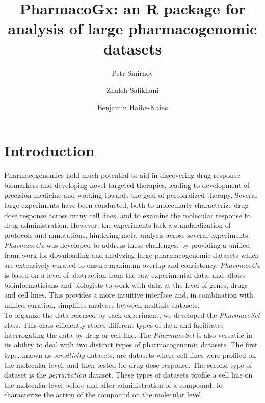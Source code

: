 \documentclass[11pt]{article}
\title{PharmacoGx: an R package for analysis of large pharmacogenomic datasets}
\author[1]{Petr Smirnov}
\author[1,2]{Zhaleh Safikhani}
\author[1,2]{Benjamin Haibe-Kains}
\affil[1]{Princess Margaret Cancer Centre, University Health Network, Toronto Canada}
\affil[2]{Department of Medical Biophysics, University of Toronto, Toronto Canada}
\begin{document}


\maketitle
\tableofcontents

\section{Introduction}

Pharmacogenomics hold much potential to aid in discovering drug response
biomarkers and developing novel targeted therapies, leading to development of
precision medicine and working towards the goal of personalized therapy.
Several large experiments have been conducted, both to molecularly
characterize drug dose response across many cell lines, and to examine the
molecular response to drug administration. However, the experiments lack a
standardization of protocols and annotations, hindering meta-analysis across
several experiments.\\

\textit{PharmacoGx} was developed to address these challenges, by providing a
unified framework for downloading and analyzing large pharmacogenomic datasets
which are extensively curated to ensure maximum overlap and consistency.
\textit{PharmacoGx} is based on a level of abstraction from the raw
experimental data, and allows bioinformaticians and biologists to work with
data at the level of genes, drugs and cell lines. This provides a more
intuitive interface and, in combination with unified curation, simplifies
analyses between multiple datasets.\\

To organize the data released by each experiment, we developed the
\textit{PharmacoSet} class. This class efficiently stores different types of
data and facilitates interrogating the data by drug or cell line. The
\textit{PharmacoSet} is also versatile in its ability to deal with two
distinct types of pharmacogenomic datasets. The first type, known as
\textit{sensitivity} datasets, are datasets where cell lines were profiled
on the molecular level, and then tested for drug dose response. The second
type of dataset is the \textit{perturbation} dataset. These types of
datasets profile a cell line on the molecular level before and after
administration of a compound, to characterize the action of the compound on
the molecular level.\\
\end{document}
